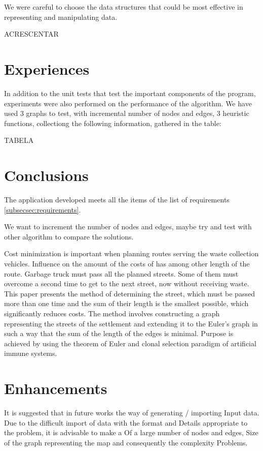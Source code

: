 \documentclass[a4paper]{article}
\begin{document}
We were careful to choose the data structures that could be most effective in representing and manipulating data.


ACRESCENTAR


\section{Experiences}

In addition to the unit tests that test the important components of the program, experiments were also performed on the performance of the algorithm. We have used 3 graphs to test, with incremental number of nodes and edges, 3 heuristic functions, collectiong the following information, gathered in the table:

TABELA

\section{Conclusions} 

The application developed meets all the items of the list of requirements \ref{subsecsec:requirements}. 


We want to increment the number of nodes and edges, maybe try and test with other algorithm to compare the solutions. 


Cost minimization is important when planning routes serving the waste collection vehicles.
Influence on the amount of the costs of has among other length of the route. Garbage truck must pass
all the planned streets. Some of them must overcome a second time to get to the next street, now
without receiving waste.
This paper presents the method of determining the street, which must be passed more than one time
and the sum of their length is the smallest possible, which significantly reduces costs. The method
involves constructing a graph representing the streets of the settlement and extending it to the Euler's
graph in such a way that the sum of the length of the edges is minimal. Purpose is achieved by using
the theorem of Euler and clonal selection paradigm of artificial immune systems.
\section{Enhancements} 


It is suggested that in future works the way of generating / importing
Input data. Due to the difficult import of data with the format and
Details appropriate to the problem, it is advisable to make a
Of a large number of nodes and edges,
Size of the graph representing the map and consequently the complexity
Problems.
\end{document}

